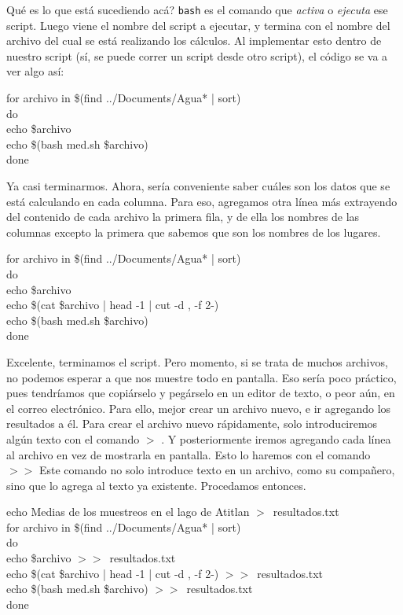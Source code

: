 \documentclass[10pt,letterpaper]{article}
\newcommand{\inlinecode}[1]{
\colorbox{light-gray}{\texttt{#1}}
}
\newenvironment{Code}
{
\begin{lrbox}{\selvestebox}%
\begin{minipage}{\dimexpr\columnwidth-2\fboxsep\relax}
\fontfamily{\ttdefault}\selectfont
}
{\end{minipage}\end{lrbox}%
\begin{center}
\colorbox{light-gray}{\usebox{\selvestebox}}
\end{center}
}
\begin{document}
Qu\'e es lo que est\'a sucediendo ac\'a? \inlinecode{bash} es el comando que \emph{activa} o \emph{ejecuta} ese script. Luego viene el nombre del script a ejecutar, y termina con el nombre del archivo del cual se est\'a realizando los c\'alculos. Al implementar esto dentro de nuestro script (s\'i, se puede correr un script desde otro script), el c\'odigo se va a ver algo as\'i:

\begin{Code}
for archivo in \$(find ../Documents/Agua* | sort)\\
do\\
echo \$archivo\\
echo \$(bash med.sh \$archivo)\\
done
\end{Code}

Ya casi terminarmos. Ahora, ser\'ia conveniente saber cu\'ales son los datos que se est\'a calculando en cada columna. Para eso, agregamos otra l\'inea m\'as extrayendo del contenido de cada archivo la primera fila, y de ella los nombres de las columnas excepto la primera que sabemos que son los nombres de los lugares.

\begin{Code}
for archivo in \$(find ../Documents/Agua* | sort)\\
do\\
echo \$archivo\\
echo \$(cat \$archivo | head -1 | cut -d , -f 2-)\\
echo \$(bash med.sh \$archivo)\\
done
\end{Code}

Excelente, terminamos el script. Pero momento, si se trata de muchos archivos, no podemos esperar a que nos muestre todo en pantalla. Eso ser\'ia poco pr\'actico, pues tendr\'iamos que copi\'arselo y peg\'arselo en un editor de texto, o peor a\'un, en el correo electr\'onico. Para ello, mejor crear un archivo nuevo, e ir agregando los resultados a \'el. Para crear el archivo nuevo r\'apidamente, solo introduciremos alg\'un texto con el comando \inlinecode{$>$}. Y posteriormente iremos agregando cada l\'inea al archivo en vez de mostrarla en pantalla. Esto lo haremos con el comando \inlinecode{$>>$} Este comando no solo introduce texto en un archivo, como su compa\~nero, sino que lo agrega al texto ya existente. Procedamos entonces.

\begin{Code}
echo Medias de los muestreos en el lago de Atitlan $>$\ resultados.txt\\
for archivo in \$(find ../Documents/Agua* | sort)\\
do\\
echo \$archivo $>>$\ resultados.txt\\
echo \$(cat \$archivo | head -1 | cut -d , -f 2-) $>>$\ resultados.txt\\
echo \$(bash med.sh \$archivo) $>>$\ resultados.txt\\
done
\end{Code}
\end{document}
